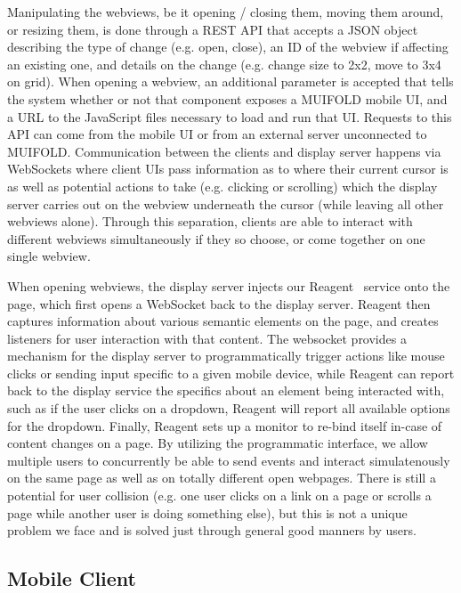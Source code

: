 Manipulating the webviews, be it opening / closing them, moving them
around, or resizing them, is done through a REST API that accepts
a JSON object describing the type of change (e.g. open, close), an
ID of the webview if affecting an existing one, and
details on the change (e.g. change size to 2x2, move to 3x4 on grid).
When opening a webview, an additional parameter is accepted that
tells the system whether or not that component exposes a MUIFOLD
mobile UI, and a URL to the JavaScript files necessary to load and
run that UI. Requests to this API can come from the mobile UI or
from an external server unconnected to MUIFOLD. Communication
between the clients and display server happens via WebSockets where
client UIs pass information as to where their current cursor is
as well as potential actions to take (e.g. clicking or scrolling)
which the display server carries out on the webview underneath
the cursor (while leaving all other webviews alone). Through this
separation, clients are able to interact with different webviews
simultaneously if they so choose, or come together on one single
webview.

When opening webviews, the display server injects our
Reagent~\cite{peveler_reagent:_2019} service onto the page, which
first opens a WebSocket back to the display server. Reagent then
captures information about various semantic elements on the page,
and creates listeners for user interaction with that content. The
websocket provides a mechanism for the display server to
programmatically trigger actions like mouse clicks or sending
input specific to a given mobile device, while Reagent can report
back to the display service the specifics about an element being
interacted with, such as if the user clicks on a dropdown, Reagent
will report all available options for the dropdown. Finally,
Reagent sets up a monitor to re-bind itself in-case of content
changes on a page. By utilizing the programmatic interface,
we allow multiple users to concurrently be able to send events
and interact simulatenously on the same page as well as
on totally different open webpages. There is still a potential
for user collision (e.g. one user clicks on a link on a page or
scrolls a page while another user is doing something else), but this
is not a unique problem we face and is solved just through general
good manners by users.

\subsection{Mobile Client}

